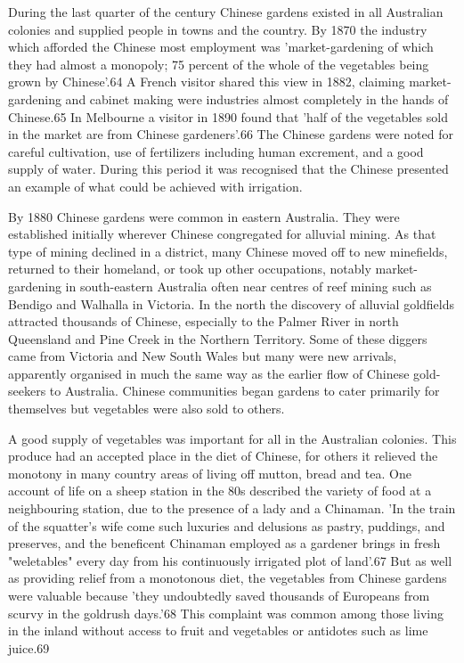 During the last quarter of the century Chinese gardens existed in all
Australian colonies and supplied people in towns and the country. By
1870 the industry which afforded the Chinese most employment was
'market-gardening of which they had almost a monopoly; 75 percent of
the whole of the vegetables being grown by Chinese'.64 A French
visitor shared this view in 1882, claiming market-gardening and
cabinet making were industries almost completely in the hands of
Chinese.65 In Melbourne a visitor in 1890 found that 'half of the
vegetables sold in the market are from Chinese gardeners'.66 The
Chinese gardens were noted for careful cultivation, use of fertilizers
including human excrement, and a good supply of water. During this
period it was recognised that the Chinese presented an example of what
could be achieved with irrigation.

By 1880 Chinese gardens were common in eastern Australia. They were
established initially wherever Chinese congregated for alluvial
mining. As that type of mining declined in a district, many Chinese
moved off to new minefields, returned to their homeland, or took up
other occupations, notably market-gardening in south-eastern Australia
often near centres of reef mining such as Bendigo and Walhalla in
Victoria. In the north the discovery of alluvial goldfields attracted
thousands of Chinese, especially to the Palmer River in north
Queensland and Pine Creek in the Northern Territory. Some of these
diggers came from Victoria and New South Wales but many were new
arrivals, apparently organised in much the same way as the earlier
flow of Chinese gold-seekers to Australia. Chinese communities began
gardens to cater primarily for themselves but vegetables were also
sold to others.

A good supply of vegetables was important for all in the Australian
colonies. This produce had an accepted place in the diet of Chinese,
for others it relieved the monotony in many country areas of living
off mutton, bread and tea. One account of life on a sheep station in
the 80s described the variety of food at a neighbouring station, due
to the presence of a lady and a Chinaman. 'In the train of the
squatter's wife come such luxuries and delusions as pastry, puddings,
and preserves, and the beneficent Chinaman employed as a gardener
brings in fresh "weletables" every day from his continuously irrigated
plot of land'.67 But as well as providing relief from a monotonous
diet, the vegetables from Chinese gardens were valuable because 'they
undoubtedly saved thousands of Europeans from scurvy in the goldrush
days.'68 This complaint was common among those living in the inland
without access to fruit and vegetables or antidotes such as lime
juice.69

